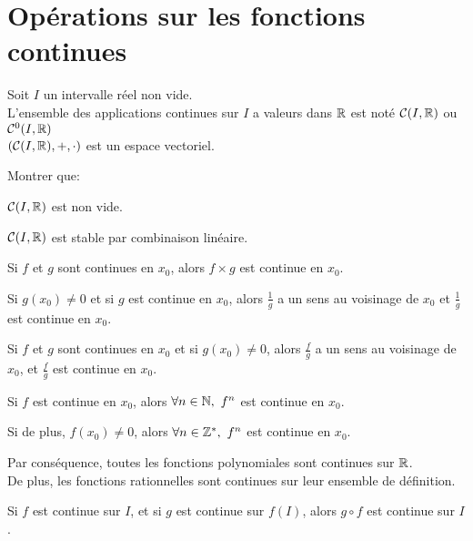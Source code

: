 \documentclass[12pt,twoside,a4paper]{article}
\begin{document}
	\section{Op\'erations sur les fonctions continues}
		\begin{prop}
			Soit $I$ un intervalle r\'eel non vide.\\
			L'ensemble des applications continues sur $I$ a valeurs dans $\mathbb{R}$ est not\'e $\mathcal{C}(I,\mathbb{R})$ ou $\mathcal{C}^{0}(I,\mathbb{R})$\\
			$\left(\mathcal{C}(I,\mathbb{R}),+,\cdot \right)$ est un espace vectoriel.
		\end{prop}
		\begin{preuve}
			Montrer que:
			\begin{liste}
				\item $\mathcal{C}(I,\mathbb{R})$ est non vide.
				\item $\mathcal{C}(I,\mathbb{R})$ est stable par combinaison lin\'eaire.
			\end{liste}
		\end{preuve}
		\begin{prop}
			\begin{liste}
				\item Si $f$ et $g$ sont continues en $x_0$, alors $f\times g$ est continue en $x_0$.
				\item Si $g(x_0)\neq 0$ et si $g$ est continue en $x_0$, alors $\frac1g$ a un sens au voisinage de $x_0$ et $\frac1g$ est continue en $x_0$.
				\item Si $f$ et $g$ sont continues en $x_0$ et si $g(x_0)\neq 0$, alors $\frac{f}g$ a un sens au voisinage de $x_0$, et $\frac{f}g$ est continue en $x_0$.
			\end{liste}
		\end{prop}
		\begin{coro}
			\begin{liste}
				\item Si $f$ est continue en $x_0$, alors $\forall n\in\mathbb{N},\ f^n$ est continue en $x_0$.
				\item Si de plus, $f(x_0)\neq0$, alors $\forall n\in\mathbb{Z}^*,\ f^n$ est continue en $x_0$.
			\end{liste}
		\end{coro}
		\begin{flushleft}
			Par cons\'equence, toutes les fonctions polynomiales sont continues sur $\mathbb{R}$.\\
			De plus, les fonctions rationnelles sont continues sur leur ensemble de d\'efinition.
		\end{flushleft}
		\begin{prop}
			Si $f$ est continue sur $I$, et si $g$ est continue sur $f(I)$, alors $g\circ f$ est continue sur $I$.
		\end{prop}
\end{document}
